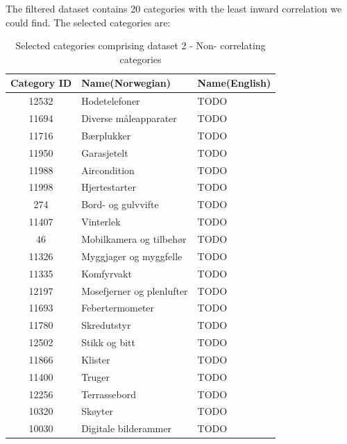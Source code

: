 The filtered dataset contains 20 categories with the least inward correlation we could find.
The selected categories are:

\begin{table}[h]
  \centering
  \caption{Selected categories comprising dataset 2 - Non- correlating categories}
  \label{table:dataset2}
  \begin{tabular}{|c|l|l|}\hline
    Category ID & Name(Norwegian)           & Name(English) \\ \hline
    12532       & Hodetelefoner             & TODO          \\ \hline
    11694       & Diverse måleapparater     & TODO          \\ \hline
    11716       & Bærplukker                & TODO          \\ \hline
    11950       & Garasjetelt               & TODO          \\ \hline
    11988       & Aircondition              & TODO          \\ \hline
    11998       & Hjertestarter             & TODO          \\ \hline
    274         & Bord- og gulvvifte        & TODO          \\ \hline
    11407       & Vinterlek                 & TODO          \\ \hline
    46          & Mobilkamera og tilbehør   & TODO          \\ \hline
    11326       & Myggjager og myggfelle    & TODO          \\ \hline
    11335       & Komfyrvakt                & TODO          \\ \hline
    12197       & Mosefjerner og plenlufter & TODO          \\ \hline
    11693       & Febertermometer           & TODO          \\ \hline
    11780       & Skredutstyr               & TODO          \\ \hline
    12502       & Stikk og bitt             & TODO          \\ \hline
    11866       & Klister                   & TODO          \\ \hline
    11400       & Truger                    & TODO          \\ \hline
    12256       & Terrassebord              & TODO          \\ \hline
    10320       & Skøyter                   & TODO          \\ \hline
    10030       & Digitale bilderammer      & TODO          \\ \hline
  \end{tabular}
\end{table}




